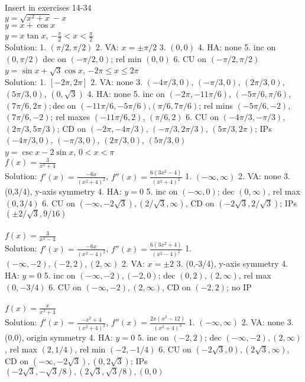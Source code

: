 \documentclass[10pt]{article}
\newcommand{\ds}{\displaystyle}
\begin{document}
Insert in exercises 14-34\\

$y=\sqrt{x^2+x}-x$\\

$y=x+\cos x$\\

$y=x\tan x$, $-\frac{\pi}{2}<x<\frac{\pi}{2}$\\
Solution:
1. $(\pi/2,\pi/2)$
2. VA: $x=\pm \pi/2$
3. $(0,0)$
4. HA: none
5. inc on $(0,\pi/2)$ dec on $(-\pi/2,0)$; rel min $(0,0)$
6. CU on $(-\pi/2,\pi/2)$\\

$y=\sin x +\sqrt3\cos x$, $-2\pi\leq x\leq 2\pi$\\
Solution:
1. $[-2\pi,2\pi]$
2. VA: none
3. $(-4\pi/3,0)$, $(-\pi/3,0)$, $(2\pi/3,0)$, $(5\pi/3,0)$, $(0,\sqrt 3)$
4. HA: none
5. inc on $(-2\pi,-11\pi/6)$, $(-5\pi/6,\pi/6)$, $(7\pi/6,2\pi);$dec on $(-11\pi/6,-5\pi/6)$,$(\pi/6,7\pi/6)$; rel mins $(-5\pi/6,-2)$,$(7\pi/6,-2)$; rel maxes $(-11\pi/6,2)$, $(\pi/6,2)$
6. CU on $(-4\pi/3,-\pi/3)$, $(2\pi/3,5\pi/3)$; CD on  $(-2\pi,-4\pi/3)$, $(-\pi/3,2\pi/3)$, $(5\pi/3,2\pi)$; IPs $(-4\pi/3,0)$, $(-\pi/3,0)$, $(2\pi/3,0)$, $(5\pi/3,0)$\\


$y=\csc x-2\sin x$, $0<x<\pi$\\

$\ds f(x)=\frac{3}{x^2+4}$\\
Solution: $f'(x)=\frac{-6x}{(x^2+4)^2}$, $f''(x)=\frac{6(3x^2-4)}{(x^2+4)^2}$
1. $(-\infty,\infty)$
2. VA: none
3. (0,3/4), y-axis symmetry
4. HA: $y=0$
5. inc on $(-\infty,0)$; dec $(0,\infty)$, rel max $(0,3/4)$
6. CU on $(-\infty,-2\sqrt 3), (2/\sqrt 3,\infty)$, CD on $(-2\sqrt 3, 2/\sqrt 3)$; IPs $(\pm 2/\sqrt 3, 9/16)$ \\ \\

$\ds f(x)=\frac{3}{x^2-4}$\\
Solution: $f'(x)=\frac{-6x}{(x^2-4)^2}$, $f''(x)=\frac{6(3x^2+4)}{(x^2-4)^2}$
1. $(-\infty,-2),(-2,2),(2,\infty)$
2. VA: $x=\pm 2$
3. (0,-3/4), y-axis symmetry
4. HA: $y=0$
5. inc on $(-\infty,-2),(-2,0)$; dec $(0,2),(2,\infty)$, rel max $(0,-3/4)$
6. CU on $(-\infty,-2), (2,\infty)$, CD on $(-2, 2)$; no IP \\ \\

$\ds f(x)=\frac{x}{x^2+4}$\\
Solution: $f'(x)=\frac{-x^2+4}{(x^2+4)^2}$, $f''(x)=\frac{2x(x^2-12)}{(x^2+4)^3}$
1. $(-\infty,\infty)$
2. VA: none
3. (0,0), origin symmetry
4. HA: $y=0$
5. inc on $(-2,2)$; dec $(-\infty,-2),(2,\infty)$, rel max $(2,1/4)$, rel min $(-2,-1/4)$
6. CU on $(-2\sqrt 3,0),(2\sqrt3,\infty)$, CD on $(-\infty,-2\sqrt 3),(0, 2\sqrt 3)$; IPs $(-2\sqrt 3, -\sqrt3/8),(2\sqrt 3, \sqrt3/8), (0,0)$ \\ \\
\end{document}
